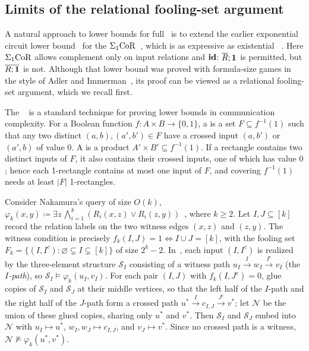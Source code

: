 \subsection{Limits of the relational fooling-set argument}\label{sec:natural-approaches}
A natural approach to lower bounds for full \CoR\ is to extend the earlier
exponential circuit lower bound~\citep[Theorems~6.1 and~6.12]{nakamura2022}
for the  $\Sigma_1\mathrm{CoR}$~\citep{nakamura2022,nakamura2023}, which is as expressive as existential \FOthree~\citep[Corollary~3.14]{nakamura2022}.
Here $\Sigma_1\mathrm{CoR}$ allows complement only on input relations and $\mathbf{id}$:
$\overline R;\mathbf{1}$ is permitted, but $\overline{R;\mathbf{1}}$ is not.
Although that lower bound was proved with formula-size games in the
style of Adler and Immerman~\citep{adler-immerman2003}, its proof can be
viewed as a relational fooling-set argument, which we recall first.

The ~\citep{yao1979,lipton-sedgewick1981,kushilevitz-nisan1997,rao-yehudayoff2020}
is a standard technique for proving lower bounds in communication complexity.
For a Boolean function $f\colon A\times B\to\{0,1\}$, a
 is a set $F\subseteq f^{-1}(1)$ such that any two
distinct $(a,b),(a',b')\in F$ have a crossed input $(a,b')$ or
$(a',b)$ of value $0$. A  is a product
$A'\times B'\subseteq f^{-1}(1)$. If a rectangle contains two distinct inputs of $F$,
it also contains their crossed inputs, one of which has value $0$; hence each
1\nobreakdash-rectangle contains at most one input of $F$, and covering
$f^{-1}(1)$ needs at least $|F|$ 1\nobreakdash-rectangles.

Consider Nakamura's query of size $O(k)$,
$\varphi_k(x,y)\coloneqq\exists z\,\bigwedge_{i=1}^k
(R_i(x,z)\lor R_i(z,y))$~\citep{nakamura2022}, where $k\ge2$.
Let $I,J\subseteq[k]$ record the relation labels on the two witness
edges $(x,z)$ and $(z,y)$. The witness condition is precisely
$f_k(I,J)=1\iff I\cup J=[k]$, with the fooling set
$F_k=\{(I,I^c):\varnothing\subsetneq I\subsetneq[k]\}$ of size
$2^k-2$.
In~\citep[\S5]{nakamura2022}, each input $(I,I^c)$ is realized by the
three-element structure $\mathcal S_I$ consisting of a witness path
$u_I\xrightarrow{\,I\,}w_I\xrightarrow{\,I^c\,}v_I$ (the \emph{$I$-path}), so $\mathcal S_I\models\varphi_k(u_I,v_I)$.
For each pair $(I,J)$ with $f_k(I,J^c)=0$, glue copies of $\mathcal S_I$ and
$\mathcal S_J$ at their middle vertices, so that the left half of the $I$-path
and the right half of the $J$-path form a crossed path
$u^*\xrightarrow{\,I\,}c_{I,J}\xrightarrow{\,J^c\,}v^*$; let $\mathcal N$ be the union of
these glued copies, sharing only $u^*$ and $v^*$.
Then $\mathcal S_I$ and $\mathcal S_J$ embed into $\mathcal N$ with
$u_I\mapsto u^*$, $w_I,w_J\mapsto c_{I,J}$, and $v_J\mapsto v^*$.
Since no crossed path is a witness,
$\mathcal N\not\models\varphi_k(u^*,v^*)$.

